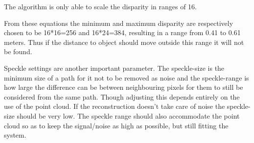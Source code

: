 The algorithm is only able to scale the disparity in ranges of 16.

From these equations the minimum and maximum disparity are respectively chosen to be 16*16=256 and                                   16*24=384, resulting in a range from 0.41 to 0.61 meters. Thus if the distance to object should move outside this range it will not be found.

Speckle settings are another important parameter. The speckle-size is the minimum size of a path for it not to be removed as noise and the speckle-range is how large the difference can be between neighbouring pixels for them to still be considered from the same path. Though adjusting this depends entirely on the use of the point cloud. If the reconstruction doesn't take care of noise the speckle-size should be very low. The speckle range should also accommodate the point cloud so as to keep the signal/noise as high as possible, but still fitting the system. 

